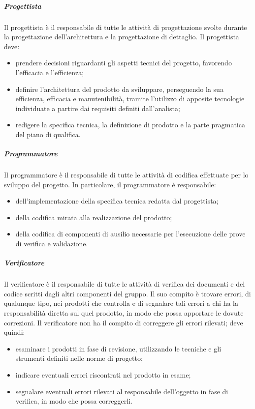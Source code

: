 		\subparagraph{Progettista}

			Il progettista è il responsabile di tutte le attività di progettazione svolte durante la progettazione dell'architettura e la progettazione di dettaglio.
			\newline
			Il progettista deve:

			\begin{itemize}
				\item prendere decisioni riguardanti gli aspetti tecnici del progetto, favorendo l'efficacia e l'efficienza;
				\item definire l'architettura del prodotto da sviluppare, perseguendo la sua efficienza, efficacia e manutenibilità, tramite l'utilizzo di apposite tecnologie individuate a partire dai requisiti definiti dall'analista;
				\item redigere la specifica tecnica, la definizione di prodotto e la parte pragmatica del piano di qualifica.
			\end{itemize}

		\subparagraph{Programmatore}

			Il programmatore è il responsabile di tutte le attività di codifica effettuate per lo sviluppo del progetto.
			\newline
			In particolare, il programmatore è responsabile:

			\begin{itemize}
				\item dell'implementazione della specifica tecnica redatta dal progettista;
				\item della codifica mirata alla realizzazione del prodotto;
				\item della codifica di componenti di ausilio necessarie per l'esecuzione delle prove di verifica e validazione.
			\end{itemize}

		\subparagraph{Verificatore}

			Il verificatore è il responsabile di tutte le attività di verifica dei documenti e del codice scritti dagli altri componenti del gruppo. Il suo compito è trovare errori, di qualunque tipo, nei prodotti che controlla e di segnalare tali errori a chi ha la responsabilità diretta sul quel prodotto, in modo che possa apportare le dovute correzioni.
			\newline
			Il verificatore non ha il compito di correggere gli errori rilevati; deve quindi:

			\begin{itemize}
				\item esaminare i prodotti in fase di revisione, utilizzando le tecniche e gli strumenti definiti nelle norme di progetto;
				\item indicare eventuali errori riscontrati nel prodotto in esame;
				\item segnalare eventuali errori rilevati al responsabile dell'oggetto in fase di verifica, in modo che possa correggerli.
			\end{itemize}

